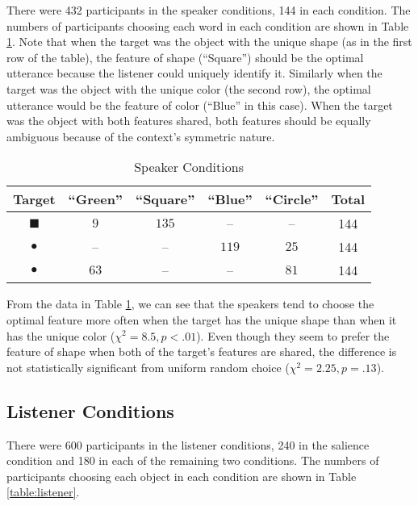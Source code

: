 There were 432 participants in the speaker conditions, 144 in each condition. The numbers of participants choosing each word in each condition are shown in Table \ref{table:speaker}. Note that when the target was the object with the unique shape (as in the first row of the table), the feature of shape (``Square'') should be the optimal utterance because the listener could uniquely identify it. Similarly when the target was the object with the unique color (the second row), the optimal utterance would be the feature of color (``Blue'' in this case). When the target was the object with both features shared, both features should be equally ambiguous because of the context's symmetric nature.

\begin{table}[htb]   
  \caption{Speaker Conditions}
  \centering
  \begin{tabular}{c|ccccc}
   Target  & ``Green'' & ``Square'' & ``Blue'' & ``Circle'' & Total\\ 
     \hline
\textcolor{green!65}{\large{$\blacksquare$}}    & $9$        &   $135$   & -- & -- &144\\
\textcolor{blue!65}{\Huge{$\bullet$}}           & --        &   --      & $119$ & $25$ & 144\\
\textcolor{green!65}{\Huge{$\bullet$}}          & $63$        &   --    &  --   & $81$             &144
  \end{tabular}

  \label{table:speaker}
\end{table}

From the data in Table \ref{table:speaker}, we can see that the
speakers tend to choose the optimal feature more often when the target
has the unique shape than when it has the unique color ($\chi^2=8.5,
p<.01$). Even though they seem to prefer the feature of shape when
both of the target's features are shared, the difference is not
statistically significant from uniform random choice ($\chi^2=2.25,
p=.13$).


\subsection{Listener Conditions}

There were 600 participants in the listener conditions, 240 in the salience condition and 180 in each of the remaining two conditions. The numbers of participants choosing each object in each condition are shown in Table \ref{table:listener}. 

